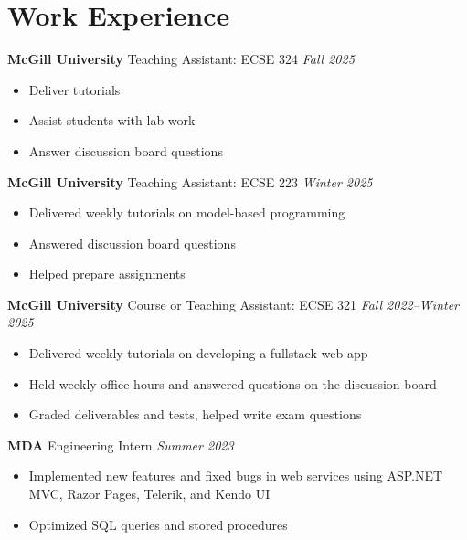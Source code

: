\documentclass[12pt]{article}
\newenvironment{gitemize}{\begin{itemize} \color{mygrey}}{\end{itemize}}
\begin{document}




\section*{Work Experience}

\textbf{McGill University} Teaching Assistant: ECSE 324
\hfill
\textit{Fall 2025}
\begin{gitemize}
	\item Deliver tutorials
	\item Assist students with lab work
	\item Answer discussion board questions
\end{gitemize}

\textbf{McGill University} Teaching Assistant: ECSE 223
\hfill
\textit{Winter 2025}
\begin{gitemize}
	\item Delivered weekly tutorials on model-based programming
	\item Answered discussion board questions
	\item Helped prepare assignments
\end{gitemize}

\textbf{McGill University} Course or Teaching Assistant: ECSE 321
\hfill
\textit{Fall 2022--Winter 2025}
\begin{gitemize}
	\item Delivered weekly tutorials on developing a fullstack web app
	\item Held weekly office hours and answered questions on the discussion board
	\item Graded deliverables and tests, helped write exam questions
\end{gitemize}

\textbf{MDA} Engineering Intern
\hfill
\textit{Summer 2023}
\begin{gitemize}
	\item Implemented new features and fixed bugs in web services using ASP.NET MVC, Razor Pages, Telerik, and Kendo UI
	\item Optimized SQL queries and stored procedures
\end{gitemize}
\end{document}

